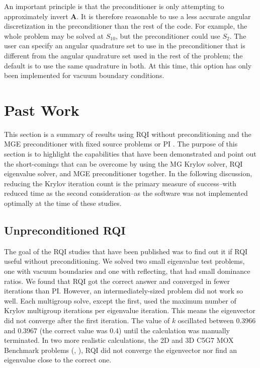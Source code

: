 \documentclass{article}                                                                           %
\newcommand{\ve}[1]{\ensuremath{\mathbf{#1}}}
\begin{document}
An important principle is that the preconditioner is only attempting to approximately invert $\ve{A}$. It is therefore reasonable to use a less accurate angular discretization in the preconditioner than the rest of the code. For example, the whole problem may be solved at $S_{10}$, but the preconditioner could use $S_{2}$. The user can specify an angular quadrature set to use in the preconditioner that is different from the angular quadrature set used in the rest of the problem; the default is to use the same quadrature in both. At this time, this option has only been implemented for vacuum boundary conditions. 

\section{Past Work}
\label{sec:pastwork}
This section is a summary of results using RQI without preconditioning \cite{Slaybaugh2012} and the MGE preconditioner with fixed source problems or PI \cite{Slaybaugh2013}. The purpose of this section is to highlight the capabilities that have been demonstrated and point out the short-comings that can be overcome by using the MG Krylov solver, RQI eigenvalue solver, and MGE preconditioner together. In the following discussion, reducing the Krylov iteration count is the primary measure of success--with reduced time as the second consideration--as the software was not implemented optimally at the time of these studies. 

\subsection{Unpreconditioned RQI}
The goal of the RQI studies that have been published was to find out it if RQI useful without preconditioning. We solved two small eigenvalue test problems, one with vacuum boundaries and one with reflecting, that had small dominance ratios. We found that RQI got the correct answer and converged in fewer iterations than PI. However, an intermediately-sized problem did not work so well. Each multigroup solve, except the first, used the maximum number of Krylov multigroup iterations per eigenvalue iteration. This means the eigenvector did not converge after the first iteration. The value of $k$ oscillated between 0.3966 and 0.3967 (the correct value was 0.4) until the calculation was manually terminated. In two more realistic calculations, the 2D and 3D C5G7 MOX Benchmark problems (\cite{OECD-NEA2003}, \cite{OECD-NEA2005}), RQI did not converge the eigenvector nor find an eigenvalue close to the correct one. 
\end{document}
